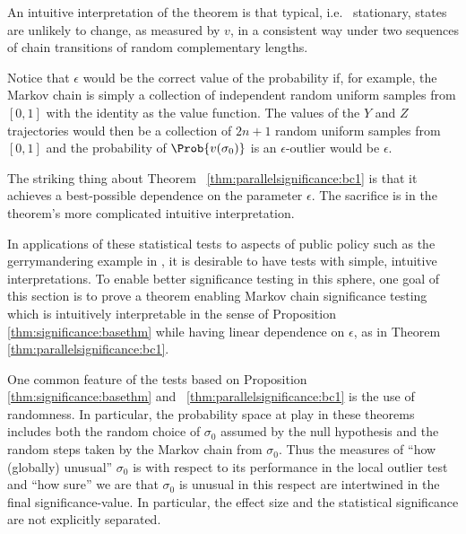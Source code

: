 \documentclass[12pt]{article}
\begin{document}
\begin{remark}
    An intuitive interpretation of the theorem is that typical, i.e.\ %
    stationary, states are unlikely to change, as measured by \( v \),
    in a consistent way under two sequences of chain transitions of
    random complementary lengths.
\end{remark}

\begin{remark}
    Notice that \( \epsilon \) would be the correct value of the
    probability if, for example, the Markov chain is simply a collection
    of independent random uniform samples from \( [0,1] \) with the
    identity as the value function.  The values of the \( Y \) and \( Z \)
    trajectories would then be a collection of \( 2n + 1 \) random
    uniform samples from \( [0,1] \) and the probability of \( \Prob{v(\sigma_0)}
    \) is an \( \epsilon \)-outlier would be \( \epsilon \).

    The striking thing about Theorem~%
    \ref{thm:parallelsignificance:bc1} is that it achieves a
    best-possible dependence on the parameter \( \epsilon \).  The
    sacrifice is in the theorem's more complicated intuitive
    interpretation.

    In applications of these statistical tests to aspects of public
    policy such as the gerrymandering example in
    \cite{doi:10.1080/2330443X.2020.1806763}, it is desirable to have
    tests with simple, intuitive interpretations.  To enable better
    significance testing in this sphere, one goal of this section is to
    prove a theorem enabling Markov chain significance testing which is
    intuitively interpretable in the sense of Proposition~%
    \ref{thm:significance:basethm} while having linear dependence on \(
    \epsilon \), as in Theorem~%
    \ref{thm:parallelsignificance:bc1}.
\end{remark}

\begin{remark}
    One common feature of the tests based on Proposition~%
    \ref{thm:significance:basethm} and~%
    \ref{thm:parallelsignificance:bc1} is the use of randomness.  In
    particular, the probability space at play in these theorems includes
    both the random choice of \( \sigma_0 \) assumed by the null
    hypothesis and the random steps taken by the Markov chain from \(
    \sigma_0 \). Thus the measures of ``how (globally) unusual'' \(
    \sigma_0 \) is with respect to its performance in the local outlier
    test and ``how sure'' we are that \( \sigma_0 \) is unusual in this
    respect are intertwined in the final significance-value.  In
    particular, the effect size and the statistical significance are not
    explicitly separated.
\end{remark}
\end{document}
